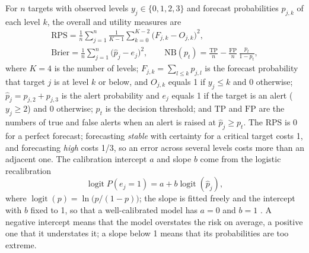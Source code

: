 \documentclass[11pt,a4paper,oneside]{report}
\begin{document}
For $n$ targets with observed levels $y_j \in \{0, 1, 2, 3\}$ and forecast probabilities $p_{j,k}$ of each level $k$, the overall and utility measures are
\begin{equation}
\begin{gathered}
  \mathrm{RPS} = \frac{1}{n}\sum_{j=1}^{n} \frac{1}{K-1}\sum_{k=0}^{K-2}\bigl(F_{j,k} - O_{j,k}\bigr)^2, \\
  \mathrm{Brier} = \frac{1}{n}\sum_{j=1}^{n}\bigl(\hat p_j - e_j\bigr)^2, \qquad
  \mathrm{NB}(p_t) = \frac{\mathrm{TP}}{n} - \frac{\mathrm{FP}}{n}\,\frac{p_t}{1-p_t},
\end{gathered}
\end{equation}
where $K = 4$ is the number of levels; $F_{j,k} = \sum_{l \leq k} p_{j,l}$ is the forecast probability that target $j$ is at level $k$ or below, and $O_{j,k}$ equals 1 if $y_j \leq k$ and 0 otherwise; $\hat p_j = p_{j,2} + p_{j,3}$ is the alert probability and $e_j$ equals 1 if the target is an alert ($y_j \geq 2$) and 0 otherwise; $p_t$ is the decision threshold; and $\mathrm{TP}$ and $\mathrm{FP}$ are the numbers of true and false alerts when an alert is raised at $\hat p_j \geq p_t$. The RPS is 0 for a perfect forecast; forecasting \emph{stable} with certainty for a critical target costs 1, and forecasting \emph{high} costs 1/3, so an error across several levels costs more than an adjacent one. The calibration intercept $a$ and slope $b$ come from the logistic recalibration
\begin{equation}
  \operatorname{logit} P(e_j = 1) = a + b \operatorname{logit}(\hat p_j),
\end{equation}
where $\operatorname{logit}(p) = \ln\bigl(p/(1-p)\bigr)$; the slope is fitted freely and the intercept with $b$ fixed to 1, so that a well-calibrated model has $a = 0$ and $b = 1$ \parencite{vancalster2019}. A negative intercept means that the model overstates the risk on average, a positive one that it understates it; a slope below 1 means that its probabilities are too extreme.
\end{document}
